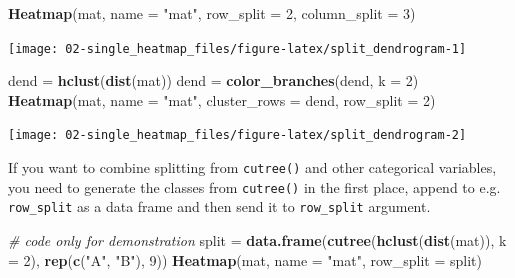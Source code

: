 \documentclass[]{book}
\newenvironment{Shaded}{\begin{snugshade}}{\end{snugshade}}
\newcommand{\KeywordTok}[1]{\textcolor[rgb]{0.13,0.29,0.53}{\textbf{#1}}}
\newcommand{\DataTypeTok}[1]{\textcolor[rgb]{0.13,0.29,0.53}{#1}}
\newcommand{\DecValTok}[1]{\textcolor[rgb]{0.00,0.00,0.81}{#1}}
\newcommand{\StringTok}[1]{\textcolor[rgb]{0.31,0.60,0.02}{#1}}
\newcommand{\CommentTok}[1]{\textcolor[rgb]{0.56,0.35,0.01}{\textit{#1}}}
\newcommand{\NormalTok}[1]{#1}
\theoremstyle{definition}
\theoremstyle{definition}
\theoremstyle{definition}
\theoremstyle{remark}
\begin{document}
\begin{Shaded}
\begin{Highlighting}[]
\KeywordTok{Heatmap}\NormalTok{(mat, }\DataTypeTok{name =} \StringTok{"mat"}\NormalTok{, }\DataTypeTok{row_split =} \DecValTok{2}\NormalTok{, }\DataTypeTok{column_split =} \DecValTok{3}\NormalTok{)}
\end{Highlighting}
\end{Shaded}

\begin{center}\texttt{[image: 02-single\_heatmap\_files/figure-latex/split\_dendrogram-1]} \end{center}

\begin{Shaded}
\begin{Highlighting}[]
\NormalTok{dend =}\StringTok{ }\KeywordTok{hclust}\NormalTok{(}\KeywordTok{dist}\NormalTok{(mat))}
\NormalTok{dend =}\StringTok{ }\KeywordTok{color_branches}\NormalTok{(dend, }\DataTypeTok{k =} \DecValTok{2}\NormalTok{)}
\KeywordTok{Heatmap}\NormalTok{(mat, }\DataTypeTok{name =} \StringTok{"mat"}\NormalTok{, }\DataTypeTok{cluster_rows =}\NormalTok{ dend, }\DataTypeTok{row_split =} \DecValTok{2}\NormalTok{)}
\end{Highlighting}
\end{Shaded}

\begin{center}\texttt{[image: 02-single\_heatmap\_files/figure-latex/split\_dendrogram-2]} \end{center}

If you want to combine splitting from \texttt{cutree()} and other
categorical variables, you need to generate the classes from
\texttt{cutree()} in the first place, append to e.g. \texttt{row\_split}
as a data frame and then send it to \texttt{row\_split} argument.

\begin{Shaded}
\begin{Highlighting}[]
\CommentTok{# code only for demonstration}
\NormalTok{split =}\StringTok{ }\KeywordTok{data.frame}\NormalTok{(}\KeywordTok{cutree}\NormalTok{(}\KeywordTok{hclust}\NormalTok{(}\KeywordTok{dist}\NormalTok{(mat)), }\DataTypeTok{k =} \DecValTok{2}\NormalTok{), }\KeywordTok{rep}\NormalTok{(}\KeywordTok{c}\NormalTok{(}\StringTok{"A"}\NormalTok{, }\StringTok{"B"}\NormalTok{), }\DecValTok{9}\NormalTok{))}
\KeywordTok{Heatmap}\NormalTok{(mat, }\DataTypeTok{name =} \StringTok{"mat"}\NormalTok{, }\DataTypeTok{row_split =}\NormalTok{ split)}
\end{Highlighting}
\end{Shaded}
\end{document}
